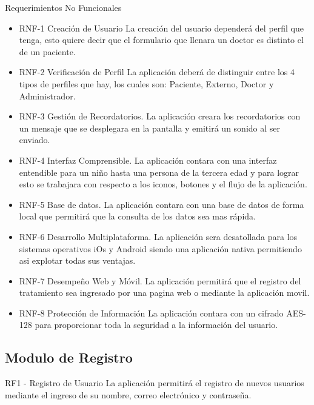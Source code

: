 Requerimientos No Funcionales
\begin{itemize}
	\item RNF-1 Creación de Usuario
	La creación del usuario dependerá del perfil que tenga, esto quiere decir que el formulario que llenara un doctor es distinto el de un paciente.
	\item RNF-2 Verificación de Perfil
	La aplicación deberá de distinguir entre los 4 tipos de perfiles que hay, los cuales son: Paciente, Externo, Doctor y Administrador.
	\item RNF-3 Gestión de Recordatorios.
	La aplicación creara los recordatorios con un mensaje que se desplegara en la pantalla y emitirá un sonido al ser enviado.
	\item RNF-4 Interfaz Comprensible.
	La aplicación contara con una interfaz entendible para un niño hasta una persona de la tercera edad y para lograr esto se trabajara con respecto a los iconos, botones y el flujo de la aplicación.
	\item RNF-5 Base de datos.
	La aplicación contara con una base de datos de forma local que permitirá que la consulta de los datos sea mas rápida.
	\item RNF-6 Desarrollo Multiplataforma.
	La aplicación sera desatollada para los sistemas operativos iOs y Android siendo una aplicación nativa permitiendo asi explotar todas sus ventajas.
	\item RNF-7 Desempeño Web y Móvil.
	La aplicación permitirá que el registro del tratamiento sea ingresado por una pagina web o mediante la aplicación movil. 
	\item RNF-8	Protección de Información
	La aplicación contara con un cifrado AES-128 para proporcionar toda la seguridad a la información del usuario.
\end{itemize}





	
	\subsection{Modulo de Registro}
RF1 - Registro de Usuario
La aplicación permitirá el registro de nuevos usuarios mediante el ingreso de su nombre, correo electrónico y contraseña.
	
	\begin{ReqUser}		
		{\alta}{}{\corregir}
	\end{ReqUser}

